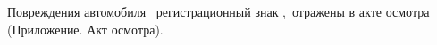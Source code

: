 \indent Повреждения автомобиля \, регистрационный знак ,\,%
отражены в акте осмотра (Приложение. Акт осмотра).
  

